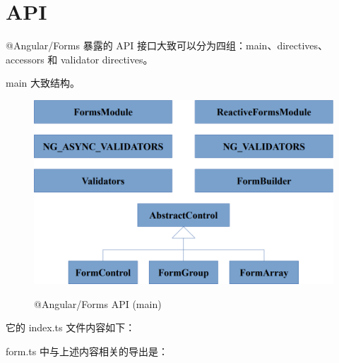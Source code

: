\section{API}


@Angular/Forms 暴露的 API 接口大致可以分为四组：main、directives、accessors 和 validator directives。


main 大致结构。

\begin{figure}[!hbt]
  \centering
  \caption{@Angular/Forms API (main)}
  \includegraphics[width=0.75\linewidth]{15_the_forms_package/forms_api_main}
  \label{fig:forms_api_main}
\end{figure}


它的 index.ts 文件内容如下：




form.ts 中与上述内容相关的导出是：




